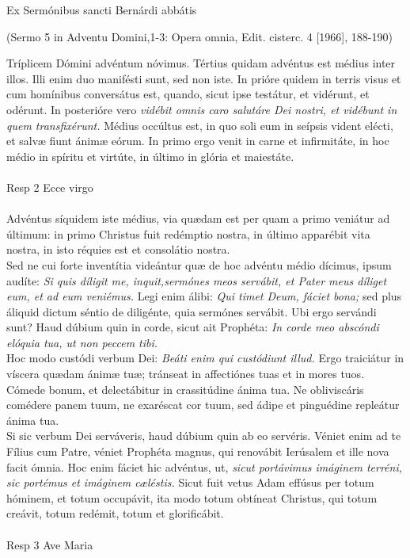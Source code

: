 \documentclass[options]{article}
\begin{document}
	Ex Sermónibus sancti Bernárdi abbátis
	\begin{flushright}
		(Sermo 5 in Adventu Domini,1-3: Opera omnia, Edit. cisterc. 4 [1966], 188-190)	
	\end{flushright}
	Tríplicem Dómini advéntum nóvimus. Tértius quidam advéntus est médius inter illos. Illi enim duo manifésti sunt, sed non iste. In prióre quidem in terris visus et cum homínibus conversátus est, quando, sicut ipse testátur, et vidérunt, et odérunt. In posterióre vero \emph{vidébit omnis caro salutáre Dei nostri, et vidébunt in quem transfixérunt.} Médius occúltus est, in quo soli eum in seípsis vident elécti, et salvæ fiunt ánimæ eórum. In primo ergo venit in carne et infirmitáte, in hoc médio in spíritu et virtúte, in último in glória et maiestáte.\\
	\\
	Resp 2 Ecce virgo\\
	\\
	Advéntus síquidem iste médius, via quædam est per quam a primo veniátur ad últimum: in primo Christus fuit redémptio nostra, in último apparébit vita nostra, in isto réquies est et consolátio nostra.\\
	Sed ne cui forte inventítia videántur quæ de hoc advéntu médio dícimus, ipsum audíte: 
	\emph{Si quis díligit me, inquit,sermónes meos servábit, et Pater meus díliget eum, et ad eum veniémus.}
	Legi enim álibi: \emph{Qui timet Deum, fáciet bona;} sed plus áliquid dictum séntio de diligénte, quia sermónes servábit. Ubi ergo servándi sunt? Haud dúbium quin in corde, sicut ait Prophéta: \emph{In corde meo abscóndi elóquia tua, ut non peccem tibi.}\\
	Hoc modo custódi verbum Dei: \emph{Beáti enim qui custódiunt illud.} Ergo traiciátur in víscera quædam ánimæ tuæ; tránseat in affectiónes tuas et in mores tuos. Cómede bonum, et delectábitur in crassitúdine ánima tua. Ne obliviscáris comédere panem tuum, ne exaréscat cor tuum, sed ádipe et pinguédine repleátur ánima tua.\\
	Si sic verbum Dei serváveris, haud dúbium quin ab eo servéris. Véniet enim ad te Fílius cum Patre, véniet Prophéta magnus, qui renovábit Ierúsalem et ille nova facit ómnia. Hoc enim fáciet hic advéntus, ut, \emph{sicut portávimus imáginem terréni, sic portémus et imáginem cæléstis.} Sicut fuit vetus Adam effúsus per totum hóminem, et totum occupávit, ita modo totum obtíneat Christus, qui totum creávit, totum redémit, totum et glorificábit. \\
	\\
	Resp 3 Ave Maria\\
	\\
\end{document}
